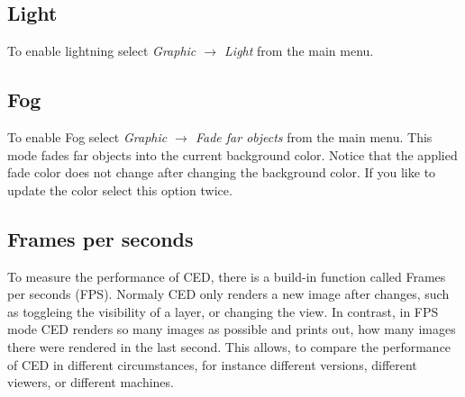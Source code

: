 \documentclass[a4paper,10pt]{article}
\begin{document}
%


\subsection{Light}
To enable lightning select \textit{Graphic $\to$ Light} from the main menu.

\subsection{Fog}
To enable Fog select \textit{Graphic $\to$ Fade far objects} from the main menu.
This mode fades far objects into the current background color.
Notice that the applied fade color does not change after changing the background color. 
If you like to update the color select this option twice.


\subsection{Frames per seconds}
To measure the performance of CED, there is a build-in function called Frames per seconds (FPS). 
Normaly CED only renders a new image after changes, such as toggleing the visibility of a layer, or changing the view. 
In contrast, in FPS mode CED renders so many images as possible and prints out, how many images there were rendered in the last second. 
This allows, to compare the performance of CED in different circumstances, for instance different versions, different viewers, or different machines. 
\end{document}
